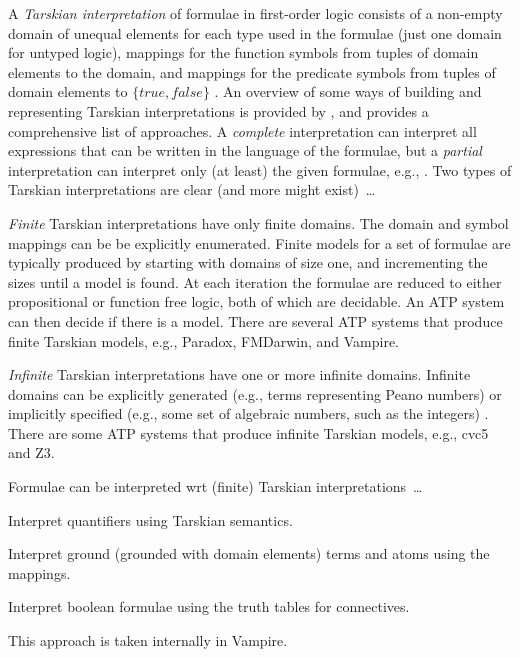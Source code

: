 \documentclass{easychair}
\newenvironment{packed_itemize}{
\vspace*{-0.3em}
\begin{itemize}
\setlength{\partopsep}{0pt}
\setlength{\itemsep}{1pt}
\setlength{\parskip}{0pt}
\setlength{\parsep}{0pt}
}{\end{itemize}}
\begin{document}
A {\em Tarskian interpretation} \cite{TV56} of formulae in first-order logic consists of a 
non-empty domain of unequal elements for each type used in the formulae (just one domain for 
untyped logic), mappings for the function symbols from tuples of domain elements to the domain,
and mappings for the predicate symbols from tuples of domain elements to $\{true,false\}$
\cite{Hun96,Gal15}.
An overview of some ways of building and representing Tarskian interpretations is provided 
by \cite{CLP04}, and \cite{Pel03-EQMC} provides a comprehensive list of approaches.
A {\em complete} interpretation can interpret all expressions that can be written in the language 
of the formulae, but a {\em partial} interpretation can interpret only (at least) the 
given formulae, e.g., \cite{BSW23}.
Two types of Tarskian interpretations are clear (and more might exist)~\ldots
\begin{packed_itemize}
\item {\em Finite} Tarskian interpretations have only finite domains.
      The domain and symbol mappings can be be explicitly enumerated.
      Finite models for a set of formulae are typically produced by starting with domains of 
      size one, and incrementing the sizes until a model is found.
      At each iteration the formulae are reduced to either propositional 
      \cite{CS03,McC03-MACE4-TR} or function free \cite{BF+09} logic, both of which are decidable.
      An ATP system can then decide if there is a model.
      There are several ATP systems that produce finite Tarskian models, e.g., Paradox, FMDarwin, 
      and Vampire.
\item {\em Infinite} Tarskian interpretations have one or more infinite domains.
      Infinite domains can be explicitly generated (e.g., terms representing Peano numbers) or 
      implicitly specified (e.g., some set of algebraic numbers, such as the integers) \cite{BB13}.
      There are some ATP systems that produce infinite Tarskian models, e.g., 
      cvc5 \cite{BB+22-cvc5} and Z3.
\end{packed_itemize}
\vspace*{-0.5em}
Formulae can be interpreted wrt (finite) Tarskian interpretations~\ldots
\begin{packed_itemize}
\item Interpret quantifiers using Tarskian semantics.
\item Interpret ground (grounded with domain elements) terms and atoms using the mappings.
\item Interpret boolean formulae using the truth tables for connectives.
\end{packed_itemize}
\vspace*{-0.5em}
This approach is taken internally in Vampire.
\end{document}
